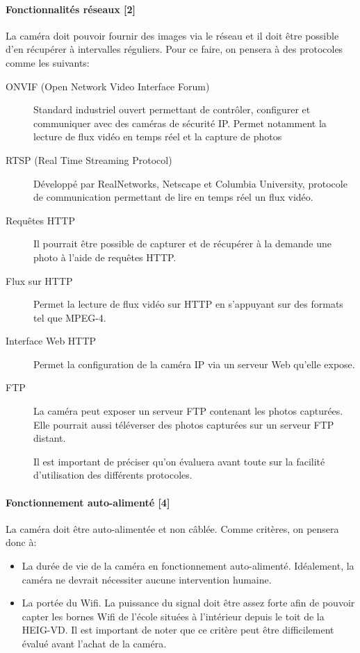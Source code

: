 \paragraph{Fonctionnalités réseaux [2]}
La caméra doit pouvoir fournir des images via le réseau et il doit être possible d'en récupérer à intervalles réguliers. Pour ce faire, on pensera à des protocoles comme les suivants: 
\begin{description}
    \item[ONVIF (Open Network Video Interface Forum)] Standard industriel ouvert permettant de contrôler, configurer et communiquer avec des caméras de sécurité IP. Permet notamment la lecture de flux vidéo en temps réel et la capture de photos \autocite{wiki:onvif}
    \item[RTSP (Real Time Streaming Protocol)] Développé par RealNetworks, Netscape et Columbia University, protocole de communication permettant de lire en temps réel un flux vidéo. \autocite{wiki:RTSP}
    \item[Requêtes HTTP] Il pourrait être possible de capturer et de récupérer à la demande une photo à l'aide de requêtes HTTP.
    \item[Flux sur HTTP] Permet la lecture de flux vidéo sur HTTP en s'appuyant sur des formats tel que MPEG-4.
    \item[Interface Web HTTP] Permet la configuration de la caméra IP via un serveur Web qu'elle expose. 
    \item[FTP] La caméra peut exposer un serveur FTP contenant les photos capturées. Elle pourrait aussi téléverser des photos capturées sur un serveur FTP distant.

Il est important de préciser qu'on évaluera avant toute sur la facilité d'utilisation des différents protocoles.
\end{description}

\paragraph{Fonctionnement auto-alimenté [4]}
La caméra doit être auto-alimentée et non câblée. Comme critères, on pensera donc à:
\begin{itemize}
    \item La durée de vie de la caméra en fonctionnement auto-alimenté. Idéalement, la caméra ne devrait nécessiter aucune intervention humaine.
    \item La portée du Wifi. La puissance du signal doit être assez forte afin de pouvoir capter les bornes Wifi de l'école situées à l'intérieur depuis le toit de la HEIG-VD. Il est important de noter que ce critère peut être difficilement évalué avant l'achat de la caméra.
\end{itemize}

